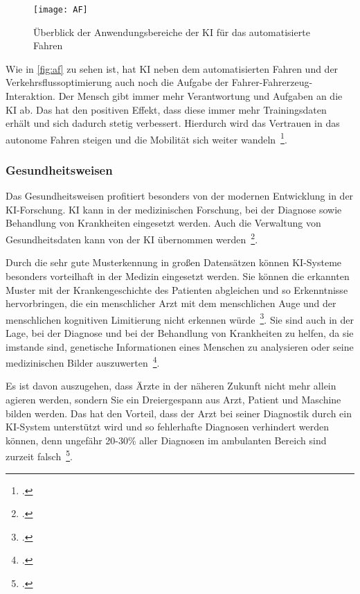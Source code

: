 \begin{figure}[H]
    \centering
    \texttt{[image: AF]} 
    \caption[Überblick der Anwendungsbereiche der KI für das automatisierte \mbox{Fahren}]{Überblick der Anwendungsbereiche der KI für das automatisierte \mbox{Fahren}\footnotemark}
    \label{fig:af}
\end{figure}

Wie in \autoref{fig:af} zu sehen ist, hat \ac{KI} neben dem automatisierten Fahren und der Verkehrsflussoptimierung auch noch die Aufgabe der Fahrer-Fahrerzeug-Interaktion. Der Mensch 
gibt immer mehr Verantwortung und Aufgaben an die \ac{KI} ab. Das hat den positiven Effekt, dass diese immer mehr Trainingsdaten erhält und sich dadurch stetig verbessert.
Hierdurch wird das Vertrauen in das autonome Fahren steigen und die Mobilität sich weiter wandeln~\footcite[\vglf][]{Wittpahl.2018}.

\subsubsection{Gesundheitsweisen}

Das Gesundheitsweisen profitiert besonders von der modernen Entwicklung in der \ac{KI}-Forschung. \ac{KI} kann in der medizinischen Forschung, bei der Diagnose sowie Behandlung 
von Krankheiten eingesetzt werden. Auch die Verwaltung von Gesundheitsdaten kann von der \ac{KI} übernommen werden~\footcite[\vglf][]{Robot.2023}.

Durch die sehr gute Musterkennung in großen Datensätzen können \ac{KI}-Systeme besonders vorteilhaft in der Medizin eingesetzt werden. Sie können die erkannten Muster mit
der Krankengeschichte des Patienten abgleichen und so Erkenntnisse hervorbringen, die ein menschlicher Arzt mit dem menschlichen Auge und der menschlichen kognitiven Limitierung nicht 
erkennen würde~\footcite[\vglf][]{Buchkremer.2020}. Sie sind auch in der Lage, bei der Diagnose und bei der Behandlung von Krankheiten zu helfen, 
da sie imstande sind, genetische Informationen eines Menschen zu analysieren oder seine medizinischen Bilder auszuwerten~\footcite[\vglf][]{Robot.2023}.

Es ist davon auszugehen, dass Ärzte in der näheren Zukunft nicht mehr allein agieren werden, sondern Sie ein Dreiergespann aus Arzt, Patient und Maschine bilden werden. 
Das hat den Vorteil, dass der Arzt bei seiner Diagnostik durch ein \ac{KI}-System unterstützt wird und so fehlerhafte Diagnosen verhindert werden können, denn ungefähr 
20-30\% aller Diagnosen im ambulanten Bereich sind zurzeit falsch~\footcite[\vglf][]{Buchkremer.2020}.

